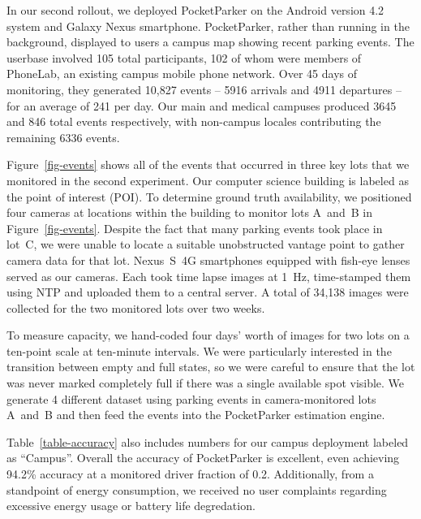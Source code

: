 In our second rollout, we deployed PocketParker on the Android version 4.2
system and Galaxy Nexus smartphone.  PocketParker, rather than running in the
background, displayed to users a campus map showing recent parking events.
The userbase involved 105 total participants, 102 of whom were members of
PhoneLab, an existing campus mobile phone network.  Over 45 days of 
monitoring, they generated 10,827 events -- 5916 arrivals and 4911 
departures -- for an average of 241 per day.  Our main and medical 
campuses produced 3645 and 846 total events respectively, with non-campus 
locales contributing the remaining 6336 events.

Figure~\ref{fig-events} shows all of the events that occurred in three key
lots that we monitored in the second experiment. Our computer science
building is labeled as the point of interest (POI). To determine ground
truth availability, we positioned four cameras at locations within the
building to monitor lots A~and~B in Figure~\ref{fig-events}.  Despite the fact
that many parking events took place in lot~C, we were unable to locate a
suitable unobstructed vantage point to gather camera data for that lot.
Nexus~S~4G smartphones equipped with fish-eye lenses served as our cameras.
Each took time lapse images at 1~Hz, time-stamped them using NTP and uploaded
them to a central server. A total of 34,138 images were collected for the two 
monitored lots over two weeks.

To measure capacity, we hand-coded four days' worth of images for two lots on
a ten-point scale at ten-minute intervals. We were particularly interested
in the transition between empty and full states, so we were careful to ensure
that the lot was never marked completely full if there was a single available
spot visible. We generate 4 different dataset using parking events in 
camera-monitored lots A~and~B and then feed the events into the PocketParker
estimation engine.

Table~\ref{table-accuracy} also includes numbers for our campus deployment
labeled as ``Campus''. Overall the accuracy of PocketParker is excellent, 
even achieving 94.2\% accuracy at a monitored driver fraction of 0.2. 
Additionally, from a standpoint of energy consumption, we received no 
user complaints regarding excessive energy usage or battery life degredation.
